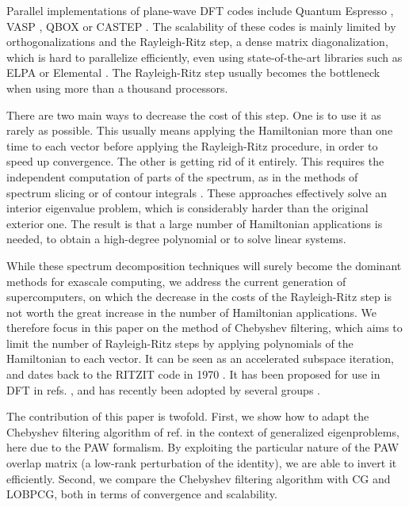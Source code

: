 \documentclass[11pt]{elsarticle}
\begin{document}
Parallel implementations of plane-wave DFT codes include Quantum
Espresso \cite{giannozzi2009quantum}, VASP \cite{kresse1996efficient},
QBOX \cite{gygi2006large} or CASTEP \cite{milman2010electron}.  The
scalability of these codes is mainly limited by orthogonalizations and
the Rayleigh-Ritz step, a dense matrix diagonalization, which is hard
to parallelize efficiently, even using state-of-the-art libraries such
as ELPA \cite{auckenthaler2011parallel} or Elemental
\cite{poulson2013elemental}. The Rayleigh-Ritz step usually becomes
the bottleneck when using more than a thousand processors.

There are two main ways to decrease the cost of this step. One is to
use it as rarely as possible. This usually means applying the
Hamiltonian more than one time to each vector before applying the
Rayleigh-Ritz procedure, in order to speed up convergence. The other
is getting rid of it entirely. This requires the independent
computation of parts of the spectrum, as in the methods of spectrum
slicing \cite{slicing} or of contour integrals \cite{polizzi,
  sakurai2003projection}. These approaches effectively solve an
interior eigenvalue problem, which is considerably harder than the
original exterior one. The result is that a large number of
Hamiltonian applications is needed, to obtain a high-degree polynomial
or to solve linear systems.

While these spectrum decomposition techniques will surely become the
dominant methods for exascale computing, we address the current
generation of supercomputers, on which the decrease in the costs of
the Rayleigh-Ritz step is not worth the great increase in the number
of Hamiltonian applications. We therefore focus in this paper on the
method of Chebyshev filtering, which aims to limit the number of
Rayleigh-Ritz steps by applying polynomials of the Hamiltonian to each
vector. It can be seen as an accelerated subspace iteration, and dates
back to the RITZIT code in 1970 \cite{rutishauser1970simultaneous}. It has
been proposed for use in DFT in refs. \cite{seq_chebfi,
  parallel_chebfi}, and has recently been adopted by several groups
\cite{berljafa2014optimized, banerjee2014spectral}.

The contribution of this paper is twofold. First, we show how to adapt
the Chebyshev filtering algorithm of ref. \cite{seq_chebfi} in the
context of generalized eigenproblems, here due to the PAW
formalism. By exploiting the particular nature of the PAW overlap
matrix (a low-rank perturbation of the identity), we are able to
invert it efficiently. Second, we compare the Chebyshev filtering
algorithm with CG and LOBPCG, both in terms of convergence and
scalability.
\end{document}
